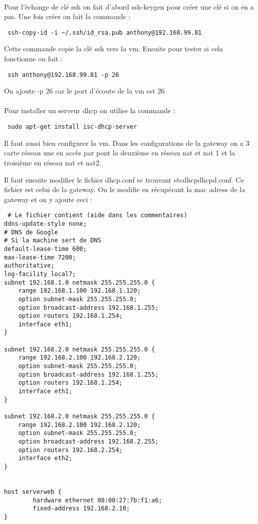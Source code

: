 \documentclass[a4paper,12pt]{article}
\begin{document}
\paragraph{}
Pour l'échange de clé ssh on fait d'abord ssh-keygen pour créer une clé si on en a pas.
Une fois créer on fait la commande :
\begin{verbatim}
 ssh-copy-id -i ~/.ssh/id_rsa.pub anthony@192.168.99.81
\end{verbatim}
Cette commande copie la clé ssh vers la vm.
Ensuite pour tester si cela fonctionne on fait :
\begin{verbatim}
 ssh anthony@192.168.99.81 -p 26
\end{verbatim}
On ajoute -p 26 car le port d'écoute de la vm est 26

\paragraph{}
Pour installer un serveur dhcp on utilise la commande :
\begin{verbatim}
 sudo apt-get install isc-dhcp-server
\end{verbatim}

Il faut aussi bien configurer la vm. Dans les configurations de la gateway on a 3 carte réseau une en accès par pont la deuxième en réseau nat et nat 1 et la troisième en réseau nat et nat2.

Il faut ensuite modifier le fichier dhcp.conf se trouvant \/etc\/dhcp\/dhcpd.conf. Ce fichier est celui de la gateway. 
On le modifie en récupérant la mac adress de la gateway et on y ajoute ceci :
\begin{verbatim}
 # Le fichier contient (aide dans les commentaires)
ddns-update-style none;
# DNS de Google
# Si la machine sert de DNS
default-lease-time 600;
max-lease-time 7200;
authoritative;
log-facility local7;
subnet 192.168.1.0 netmask 255.255.255.0 {
    range 192.168.1.100 192.168.1.120;
    option subnet-mask 255.255.255.0;
    option broadcast-address 192.168.1.255;
    option routers 192.168.1.254;
    interface eth1;
}

subnet 192.168.2.0 netmask 255.255.255.0 {
    range 192.168.2.100 192.168.2.120;
    option subnet-mask 255.255.255.0;
    option broadcast-address 192.168.1.255;
    option routers 192.168.1.254;
    interface eth1;
}

subnet 192.168.2.0 netmask 255.255.255.0 {
    range 192.168.2.100 192.168.2.120;
    option subnet-mask 255.255.255.0;
    option broadcast-address 192.168.2.255;
    option routers 192.168.2.254;
    interface eth2;
}


host serverweb {
        hardware ethernet 08:00:27:7b:f1:a6;
        fixed-address 192.168.2.10;
}


\end{verbatim}
\end{document}
